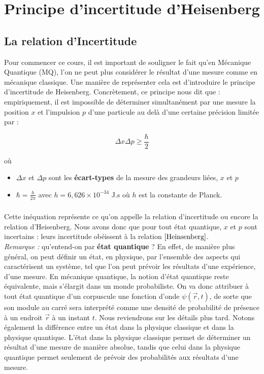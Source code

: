\documentclass[../Notes de cours]{subfiles}
\begin{document}
\chapter{Principe d'incertitude d'Heisenberg}

\section{La relation d'Incertitude}
Pour commencer ce cours, il est important de souligner le fait qu'en Mécanique Quantique (MQ), l'on ne peut plus considérer le résultat d'une mesure comme en mécanique classique. 
Une manière de représenter cela est d'introduire le principe d'incertitude de Heisenberg. 
Concrètement, ce principe nous dit que : empiriquement, il est impossible de déterminer simultanément par une mesure la position $x$ et l'impulsion $p$ d'une particule au delà d'une certaine précision limitée par : 

\begin{equation}
\label{Heinsenberg}
\Delta x \Delta p \geq \frac{\hbar}{2}
\end{equation}

où 
\begin{itemize}[label=\textbullet]
	\item $\Delta x$ et $\Delta p$ sont les \textbf{écart-types} de la mesure des grandeurs liées, $x$ et $p$
	\item $\hbar = \frac{h}{2\pi}$ avec $h = 6,626 \times 10^{-34}$ J.s où $h$ est la constante de Planck. 
\end{itemize}

\paragraph{} Cette inéquation représente ce qu'on appelle la relation d'incertitude ou encore la relation d'Heisenberg.
\newline Nous avons donc que pour tout état quantique, $x$ et $p$ sont incertains : leurs incertitude obéissent à la relation $\ref{Heinsenberg}$. \\

\textit{Remarque :} qu'entend-on par \textbf{état quantique} ? En effet, de manière plus général, on peut définir un état, en physique, par l'ensemble des aspects qui caractérisent
    un système, tel que l'on peut prévoir les résultats d'une expérience, d'une mesure. 
    \newline En mécanique quantique, la notion d'état quantique reste équivalente, mais s'élargit dans un monde probabiliste. On va donc attribuer à tout état quantique d'un corpuscule une fonction d'onde $\psi(\Vec{r},t)$, de sorte que son module au carré sera interprété comme une densité de probabilité de présence à un endroit $\Vec{r}$ à un instant $t$. Nous reviendrons sur les détails plus tard. 
    \newline Notons également la différence entre un état dans la physique classique et dans la physique quantique. L'état dans la physique classique permet de déterminer un résultat d'une mesure 
    de manière absolue, tandis que celui dans la physique quantique permet seulement de prévoir des probabilités aux résultats d'une mesure. \\
\end{document}
